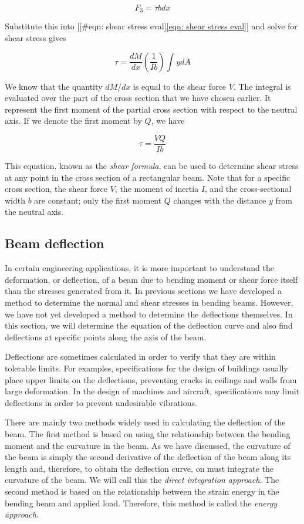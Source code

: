 \documentclass[a4paper,openany,12pt]{book}
\begin{document}
$$F_3 = \tau bdx$$

Substitute this into
[[\#eqn: shear stress eval]\ref{eqn: shear stress eval}] and solve for
shear stress gives

$$\tau  = \frac{dM}{dx}\left( \frac{1}{Ib} \right) \int ydA$$

We know that the quantity \(dM/dx\) is equal to the shear force \(V\). The
integral is evaluated over the part of the cross section that we have
chosen earlier. It represent the first moment of the partial cross
section with respect to the neutral axis. If we denote the first moment
by \(Q\), we have

$$\tau  = \frac{VQ}{Ib}$$

This equation, known as the \emph{shear formula}, can be used to determine
shear stress at any point in the cross section of a rectangular beam.
Note that for a specific cross section, the shear force \(V\), the moment
of inertia \(I\), and the cross-sectional width \(b\) are constant; only the
first moment \(Q\) changes with the distance \(y\) from the neutral axis.

\subsection{Beam deflection}
\label{subsection: beam deflection}
In certain engineering applications, it is more important to understand
the deformation, or deflection, of a beam due to bending moment or shear
force itself than the stresses generated from it. In previous sections
we have developed a method to determine the normal and shear stresses in
bending beams. However, we have not yet developed a method to determine
the deflections themselves. In this section, we will determine the
equation of the deflection curve and also find deflections at specific
points along the axis of the beam.

Deflections are sometimes calculated in order to verify that they are
within tolerable limits. For examples, specifications for the design of
buildings usually place upper limits on the deflections, preventing
cracks in ceilings and walls from large deformation. In the design of
machines and aircraft, specifications may limit deflections in order to
prevent undesirable vibrations.

There are mainly two methods widely used in calculating the deflection
of the beam. The first method is based on using the relationship between
the bending moment and the curvature in the beam. As we have discussed,
the curvature of the beam is simply the second derivative of the
deflection of the beam along its length and, therefore, to obtain the
deflection curve, on must integrate the curvature of the beam. We will
call this the \emph{direct integration approach}. The second method is based
on the relationship between the strain energy in the bending beam and
applied load. Therefore, this method is called the \emph{energy approach}.
\end{document}
